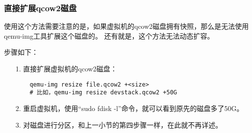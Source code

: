 \documentclass[a4paper,left=2.5cm,right=2.5cm,11pt]{article}
\begin{document}
\subsubsection{直接扩展qcow2磁盘}
	使用这个方法需要注意的是，如果虚拟机的qcow2磁盘拥有快照，那么是无法使用qemu-img工具扩展这个磁盘的。
	还有就是，这个方法无法动态扩容。\par
	步骤如下：
	\begin{itemize}
		\item[1.] 直接扩展虚拟机的qcow2磁盘：
		\begin{lstlisting}
	qemu-img resize file.qcow2 +<size>
	# 比如，qemu-img resize devstack.qcow2 +50G
		\end{lstlisting}

		\item[2.] 重启虚拟机，使用“sudo fdisk -l”命令，就可以看到原先的磁盘多了50G。

		\item[3.] 对磁盘进行分区，和上一小节的第四步骤一样，在此就不再详述。
	\end{itemize}
\end{document}
